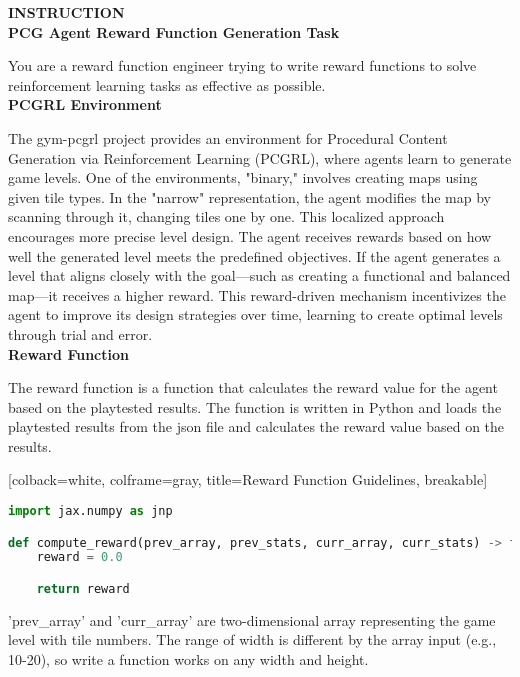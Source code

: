 
\begin{tcolorbox}[colback=white, colframe=gray, title=Reward Refinement, breakable]

{\textbf{\MakeUppercase{Instruction}}}  \\

\textbf{PCG Agent Reward Function Generation Task}

You are a reward function engineer trying to write reward functions to solve reinforcement learning tasks as effective as possible.\\

\textbf{PCGRL Environment}

The gym-pcgrl project provides an environment for Procedural Content Generation via Reinforcement Learning (PCGRL), where agents learn to generate game levels.
One of the environments, "binary," involves creating maps using given tile types.
In the "narrow" representation, the agent modifies the map by scanning through it, changing tiles one by one.
This localized approach encourages more precise level design.
The agent receives rewards based on how well the generated level meets the predefined objectives.
If the agent generates a level that aligns closely with the goal—such as creating a functional and balanced map—it receives a higher reward.
This reward-driven mechanism incentivizes the agent to improve its design strategies over time, learning to create optimal levels through trial and error.\\

\textbf{Reward Function}

The reward function is a function that calculates the reward value for the agent based on the playtested results.
The function is written in Python and loads the playtested results from the json file and calculates the reward value based on the results.

[colback=white, colframe=gray, title=Reward Function Guidelines, breakable]
\begin{lstlisting}[language=Python]
import jax.numpy as jnp

def compute_reward(prev_array, prev_stats, curr_array, curr_stats) -> float:
    reward = 0.0

    return reward
\end{lstlisting}

'prev\_array' and 'curr\_array' are two-dimensional array representing the game level with tile numbers. 
The range of width is different by the array input (e.g., 10-20), so write a function works on any width and height.


\end{tcolorbox}
